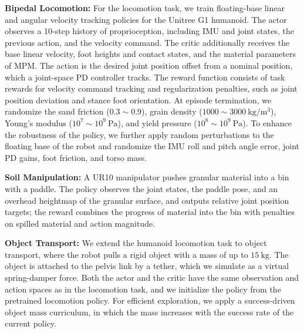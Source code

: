\textbf{Bipedal Locomotion:}
For the locomotion task, we train floating-base linear and angular velocity tracking policies for the Unitree G1 humanoid.
The actor observes a 10-step history of proprioception, including IMU and joint states, the previous action, and the velocity command.
The critic additionally receives the base linear velocity, foot heights and contact states, and the material parameters of MPM.
The action is the desired joint position offset from a nominal position, which a joint-space PD controller tracks.
The reward function consists of task rewards for velocity command tracking and regularization penalties, such as joint position deviation and stance foot orientation.
At episode termination, we randomize the sand friction ($0.3 \sim 0.9$), grain density ($1000 \sim 3000\mathrm{~kg/m^3}$), Young's modulus ($10^7 \sim 10^9 \mathrm{~Pa}$), and yield pressure ($10^8 \sim 10^9 \mathrm{~Pa}$).
To enhance the robustness of the policy, we further apply random perturbations to the floating base of the robot and randomize the IMU roll and pitch angle error, joint PD gains, foot friction, and torso mass.

\textbf{Soil Manipulation:}
A UR10 manipulator pushes granular material into a bin with a paddle.
The policy observes the joint states, the paddle pose, and an overhead heightmap of the granular surface, and outputs relative joint position targets; the reward combines the progress of material into the bin with penalties on spilled material and action magnitude.

\textbf{Object Transport:}
We extend the humanoid locomotion task to object transport, where the robot pulls a rigid object with a mass of up to $15\mathrm{~kg}$.
The object is attached to the pelvis link by a tether, which we simulate as a virtual spring-damper force.
Both the actor and the critic have the same observation and action spaces as in the locomotion task, and we initialize the policy from the pretrained locomotion policy.
For efficient exploration, we apply a success-driven object mass curriculum, in which the mass increases with the success rate of the current policy.

